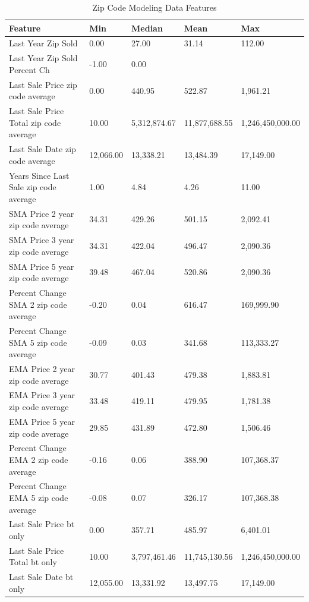 \documentclass[conference,final,]{IEEEtran}
\begin{document}
\begin{table}

\caption{\label{tab:Table 2}\label{tab:zipcodemodelfeats} Zip Code Modeling Data Features}
\centering
\begin{tabular}[t]{l|l|l|l|l}
\hline
Feature & Min & Median & Mean & Max\\
\hline
Last Year Zip Sold & 0.00 & 27.00 & 31.14 & 112.00\\
\hline
Last Year Zip Sold Percent Ch & -1.00 & 0.00 &  & \\
\hline
Last Sale Price zip code average & 0.00 & 440.95 & 522.87 & 1,961.21\\
\hline
Last Sale Price Total zip code average & 10.00 & 5,312,874.67 & 11,877,688.55 & 1,246,450,000.00\\
\hline
Last Sale Date zip code average & 12,066.00 & 13,338.21 & 13,484.39 & 17,149.00\\
\hline
Years Since Last Sale zip code average & 1.00 & 4.84 & 4.26 & 11.00\\
\hline
SMA Price 2 year zip code average & 34.31 & 429.26 & 501.15 & 2,092.41\\
\hline
SMA Price 3 year zip code average & 34.31 & 422.04 & 496.47 & 2,090.36\\
\hline
SMA Price 5 year zip code average & 39.48 & 467.04 & 520.86 & 2,090.36\\
\hline
Percent Change SMA 2 zip code average & -0.20 & 0.04 & 616.47 & 169,999.90\\
\hline
Percent Change SMA 5 zip code average & -0.09 & 0.03 & 341.68 & 113,333.27\\
\hline
EMA Price 2 year zip code average & 30.77 & 401.43 & 479.38 & 1,883.81\\
\hline
EMA Price 3 year zip code average & 33.48 & 419.11 & 479.95 & 1,781.38\\
\hline
EMA Price 5 year zip code average & 29.85 & 431.89 & 472.80 & 1,506.46\\
\hline
Percent Change EMA 2 zip code average & -0.16 & 0.06 & 388.90 & 107,368.37\\
\hline
Percent Change EMA 5 zip code average & -0.08 & 0.07 & 326.17 & 107,368.38\\
\hline
Last Sale Price bt only & 0.00 & 357.71 & 485.97 & 6,401.01\\
\hline
Last Sale Price Total bt only & 10.00 & 3,797,461.46 & 11,745,130.56 & 1,246,450,000.00\\
\hline
Last Sale Date bt only & 12,055.00 & 13,331.92 & 13,497.75 & 17,149.00\\

\end{tabular}
\end{table}
\end{document}
